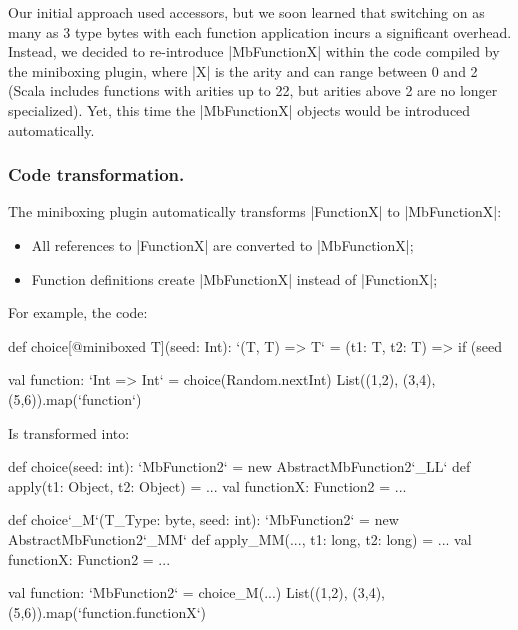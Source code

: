 Our initial approach used accessors, but we soon learned that switching on as many as 3 type bytes with each function application incurs a significant overhead. Instead, we decided to re-introduce |MbFunctionX| within the code compiled by the miniboxing plugin, where |X| is the arity and can range between 0 and 2 (Scala includes functions with arities up to 22, but arities above 2 are no longer specialized). Yet, this time the |MbFunctionX| objects would be introduced automatically.

\subsubsection{Code transformation.} The miniboxing plugin automatically transforms |FunctionX| to |MbFunctionX|:

\begin{itemize}
  \item All references to |FunctionX| are converted to |MbFunctionX|;
  \item Function definitions create |MbFunctionX| instead of |FunctionX|;
\end{itemize}

For example, the code:

\begin{lstlisting-nobreak}
 def choice[@miniboxed T](seed: Int): `(T, T) => T` =
   (t1: T, t2: T) => if (seed %

 val function: `Int => Int` = choice(Random.nextInt)
 List((1,2), (3,4), (5,6)).map(`function`)
\end{lstlisting-nobreak}

Is transformed into:

\begin{lstlisting-nobreak}
 def choice(seed: int): `MbFunction2` =
   new AbstractMbFunction2`_LL` {
     def apply(t1: Object, t2: Object) = ...
     val functionX: Function2 = ...
   }
\end{lstlisting-nobreak}

\begin{lstlisting-nobreak}
 def choice`_M`(T_Type: byte, seed: int): `MbFunction2` =
   new AbstractMbFunction2`_MM` {
     def apply_MM(..., t1: long, t2: long) = ...
     val functionX: Function2 = ...
   }

 val function: `MbFunction2` = choice_M(...)
 List((1,2), (3,4), (5,6)).map(`function.functionX`)
\end{lstlisting-nobreak}

